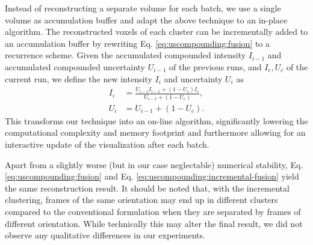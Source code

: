 Instead of reconstructing a separate volume for each batch, we use a single volume as accumulation buffer and adapt the above technique to an in-place algorithm.
The reconstructed voxels of each cluster can be incrementally added to an accumulation buffer by rewriting Eq. \ref{eq:uscompounding:fusion} to a recurrence scheme. 
Given the accumulated compounded intensity $I_{i-1}$ and accumulated compounded uncertainty $U_{i-1}$ of the previous runs, and $I_c, U_c$ of the current run, we define the new intensity $I_i$ and uncertainty $U_i$ as
\begin{equation}
	\label{eq:uscompounding:incremental-fusion}
	\begin{split}
		I_i		&=		\frac{U_{i-1} I_{i-1}   +   (1 - U_c) I_c}{U_{i-1}   +  (1 - U_c)}, \\
		U_i		&=		U_{i-1}   +  (1 - U_c).
	\end{split}
\end{equation}
This transforms our technique into an on-line algorithm, significantly lowering the computational complexity and memory footprint and furthermore allowing for an interactive update of the visualization after each batch.

Apart from a slightly worse (but in our case neglectable) numerical stability, Eq. \ref{eq:uscompounding:fusion} and Eq. \ref{eq:uscompounding:incremental-fusion} yield the same reconstruction result.
It should be noted that, with the incremental clustering, frames of the same orientation may end up in different clusters compared to the conventional formulation when they are separated by frames of different orientation.
While technically this may alter the final result, we did not observe any qualitative differences in our experiments.


